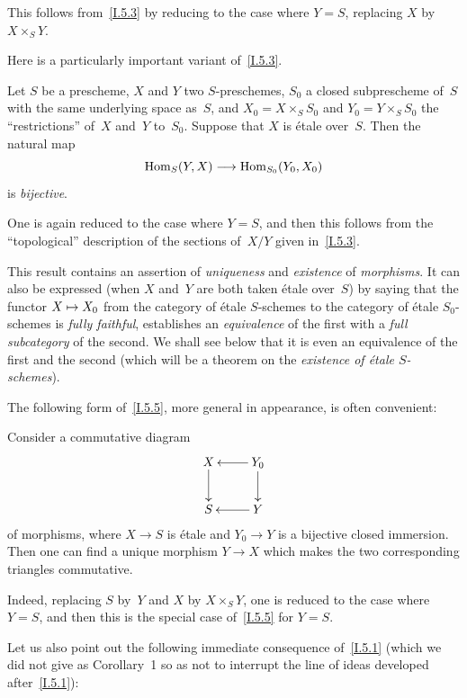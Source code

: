 This follows from~\ref{I.5.3} by reducing to the case where
$Y=S$, replacing $X$ by $X\times_S Y$.

Here is a particularly important variant of~\ref{I.5.3}.

\begin{theorem}
\label{I.5.5}
Let $S$ be a prescheme, $X$ and $Y$ two $S$-preschemes, $S_0$
a closed subprescheme of~$S$ with the same underlying space
as~$S$, and $X_0=X\times_S S_0$ and $Y_0=Y\times_S S_0$ the
``restrictions'' of~$X$ and~$Y$ to~$S_0$. Suppose that $X$ is
\'etale over~$S$. Then the natural map
\[
\Hom_S(Y,X)\to\Hom_{S_0}(Y_0,X_0)
\]
is \emph{bijective}.
\end{theorem}

One is again reduced to the case where $Y=S$, and then this
follows from the ``topological'' description of the sections
of~$X/Y$ given in~\ref{I.5.3}.

\begin{scholium}
This result contains an assertion of \emph{uniqueness} and
\emph{existence} of \emph{morphisms}. It can also be expressed
(when $X$ and~$Y$ are both taken \'etale over~$S$) by saying that
the functor $X\mto X_0$ from the category of \'etale $S$-schemes
to the category of \'etale $S_0$-schemes is \emph{fully faithful},
\ie establishes an \emph{equivalence} of the first with a
\emph{full subcategory} of the second. We shall see below that
it is even an equivalence of the first and the second
(which will be a theorem on the \emph{existence of \'etale
$S$-schemes}).
\end{scholium}

The
following form of~\ref{I.5.5}, more general in appearance, is
often convenient:

\begin{corollary}
\label{I.5.6}
Consider a commutative diagram
\[
\xymatrix{
X\ar[d]&\ar[l]Y_0\ar[d]\\
S&\ar[l]Y
}
\]
of morphisms, where $X\to S$ is \'etale and $Y_0\to Y$ is
a bijective closed immersion. Then one can find a unique
morphism $Y\to X$ which makes the two corresponding triangles
commutative.
\end{corollary}

Indeed, replacing $S$ by~$Y$ and $X$ by $X\times_S Y$, one is
reduced to the case where $Y=S$, and then this is the special
case of~\ref{I.5.5} for $Y=S$.

Let us also point out the following immediate consequence
of~\ref{I.5.1} (which we did not give as Corollary~1 so as not
to interrupt the line of ideas developed after~\ref{I.5.1}):

